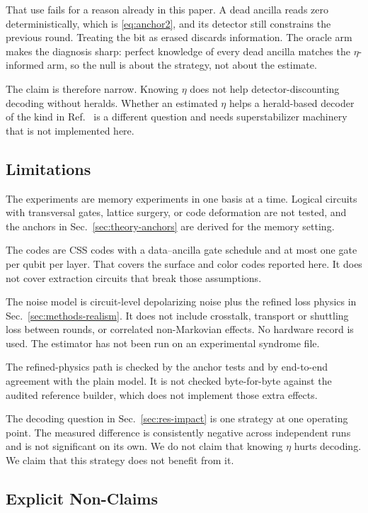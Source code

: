 \documentclass{ieeeaccess}
\begin{document}
That use fails for a reason already in this paper. A dead ancilla reads zero
deterministically, which is \eqref{eq:anchor2}, and its detector still
constrains the previous round. Treating the bit as erased discards information.
The oracle arm makes the diagnosis sharp: perfect knowledge of every dead
ancilla matches the $\eta$-informed arm, so the null is about the strategy,
not about the estimate.

The claim is therefore narrow. Knowing $\eta$ does not help
detector-discounting decoding without heralds. Whether an estimated $\eta$
helps a herald-based decoder of the kind in
Ref.~\cite{perrin2026correlatedloss} is a different question and needs
superstabilizer machinery that is not implemented here.

\subsection{Limitations}
\label{sec:disc-limitations}

The experiments are memory experiments in one basis at a time. Logical
circuits with transversal gates, lattice surgery, or code deformation are not
tested, and the anchors in Sec.~\ref{sec:theory-anchors} are derived for the
memory setting.

The codes are CSS codes with a data--ancilla gate schedule and at most one
gate per qubit per layer. That covers the surface and color codes reported
here. It does not cover extraction circuits that break those assumptions.

The noise model is circuit-level depolarizing noise plus the refined loss
physics in Sec.~\ref{sec:methods-realism}. It does not include crosstalk,
transport or shuttling loss between rounds, or correlated non-Markovian
effects. No hardware record is used. The estimator has not been run on an
experimental syndrome file.

The refined-physics path is checked by the anchor tests and by end-to-end
agreement with the plain model. It is not checked byte-for-byte against the
audited reference builder, which does not implement those extra effects.

The decoding question in Sec.~\ref{sec:res-impact} is one strategy at one
operating point. The measured difference is consistently negative across
independent runs and is not significant on its own. We do not claim that
knowing $\eta$ hurts decoding. We claim that this strategy does not benefit
from it.

\subsection{Explicit Non-Claims}
\label{sec:disc-nonclaims}
\end{document}
